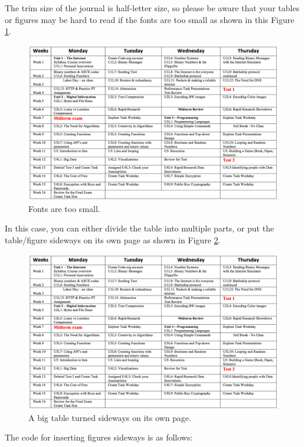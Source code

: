 \documentclass[article,twoside]{combine}
\begin{document}
The trim size of the journal is half-letter size, so please be aware that your
tables or figures may be hard to read if the fonts are too small as shown in
this Figure \ref{figure:big_table}.
\begin{figure}[htbp]
\centering
\includegraphics[width=\textwidth]{big_table.png}
\caption{Fonts are too small.}
\label{figure:big_table}
\end{figure}

In this case, you can either divide the table into multiple parts, or put the
table/figure sideways on its own page as shown in Figure \ref{figure:big_table1}.
\begin{figure}
  \includegraphics[width=\textwidth]{big_table.png}
  \caption{A big table turned sideways on its own page.}
  \label{figure:big_table1}
\end{figure}

The code for inserting figures sideways is as follows:
\end{document}
